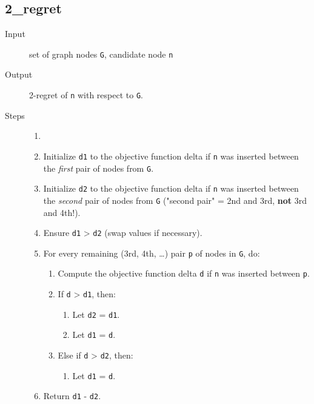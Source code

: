 \documentclass[14pt]{article}
\begin{document}
\subsection{2\_regret}
\begin{description}
	\item [Input] set of graph nodes \verb`G`, candidate node \verb`n`
	\item [Output] 2-regret of \verb`n` with respect to \verb`G`.
	\item [Steps]
		\begin{enumerate}\item []
			\item Initialize \verb`d1` to the objective function delta if
				\verb`n` was inserted between the \emph{first} pair of nodes
				from \verb`G`.
			\item Initialize \verb`d2` to the objective function delta if
				\verb`n` was inserted between the \emph{second} pair of nodes
				from \verb`G` ("second pair" = 2nd and 3rd, \textbf{not} 3rd
				and 4th!).
			\item Ensure \verb`d1` > \verb`d2` (swap values if necessary).
			\item For every remaining (3rd, 4th, …) pair \verb`p` of nodes in
				\verb`G`, do:
				\begin{enumerate}
					\item Compute the objective function delta \verb`d` if
						\verb`n` was inserted between \verb`p`.
					\item If \verb`d` > \verb`d1`, then:
						\begin{enumerate}
							\item Let \verb`d2` = \verb`d1`.
							\item Let \verb`d1` = \verb`d`.
						\end{enumerate}
					\item Else if \verb`d` > \verb`d2`, then:
						\begin{enumerate}
							\item Let \verb`d1` = \verb`d`.
						\end{enumerate}
				\end{enumerate}
			\item Return \verb`d1` - \verb`d2`.
		\end{enumerate}
\end{description}
\end{document}
